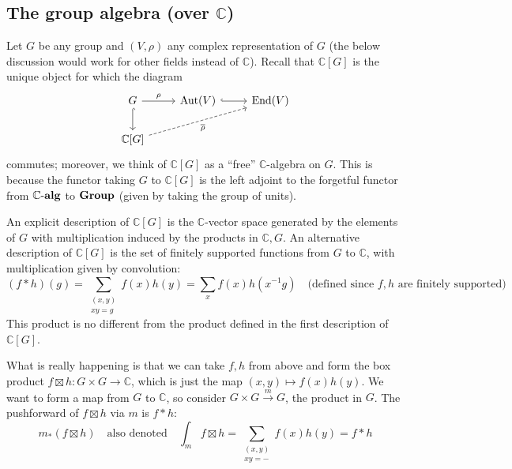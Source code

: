 \documentclass[11pt,leqno]{article}
\theoremstyle{plain}
\theoremstyle{definition}
\numberwithin{equation}{section}
\numberwithin{lem}{section}
\DeclareMathOperator{\Aut}{Aut}
\DeclareMathOperator{\End}{End}
\newcommand{\catname}[1]{{\normalfont\mathbf{#1}}}
\newcommand{\alg}{\text{-}\catname{alg}}
\newcommand{\Group}{\catname{Group}}
\begin{document}
\subsection{The group algebra (over $\mathbb C$)}
Let $G$ be any group and $(V,\rho)$ any complex representation of $G$ (the below discussion would work for other fields instead of $\mathbb C$). Recall that $\mathbb C[G]$ is the unique object for which the diagram 
\[\begin{tikzcd}[ampersand replacement=\&]
	G \& {\Aut(V)} \& {\End(V)} \\
	{\mathbb C[G]}
	\arrow["\rho", from=1-1, to=1-2]
	\arrow[hook, from=1-1, to=2-1]
	\arrow[hook, from=1-2, to=1-3]
	\arrow["{\overline\rho}"', dashed, from=2-1, to=1-3]
\end{tikzcd}\]
commutes; moreover, we think of $\mathbb C[G]$ as a ``free'' $\mathbb C$-algebra on $G$. This is because the functor taking $G$ to $\mathbb C[G]$ is the left adjoint to the forgetful functor from $\mathbb C\alg$ to $\Group$ (given by taking the group of units).

An explicit description of $\mathbb C[G]$ is the $\mathbb C$-vector space generated by the elements of $G$ with multiplication induced by the products in $\mathbb C, G$. An alternative description of $\mathbb C[G]$ is the set of finitely supported functions from $G$ to $\mathbb C$, with multiplication given by convolution:
\[(f\ast h)(g) = \sum_{\substack{(x,y)\\xy=g}}f(x)h(y) = \sum_{x}f(x)h(x^{-1}g)\quad\text{(defined since $f,h$ are finitely supported)}\]
This product is no different from the product defined in the first description of $\mathbb C[G]$.

What is really happening is that we can take $f,h$ from above and form the box product $f\boxtimes h\colon G\times G \to \mathbb C$, which is just the map $(x,y)\mapsto f(x)h(y)$. We want to form a map from $G$ to $\mathbb C$, so consider $G\times G\xrightarrow{m}G$, the product in $G$. The pushforward of $f\boxtimes h$ via $m$ is $f\ast h$:
\[m_\ast(f\boxtimes h) \quad\text{also denoted}\quad \int_mf\boxtimes h = \sum_{{\substack{(x,y)\\xy=-}}}f(x)h(y) = f\ast h\]
\end{document}
